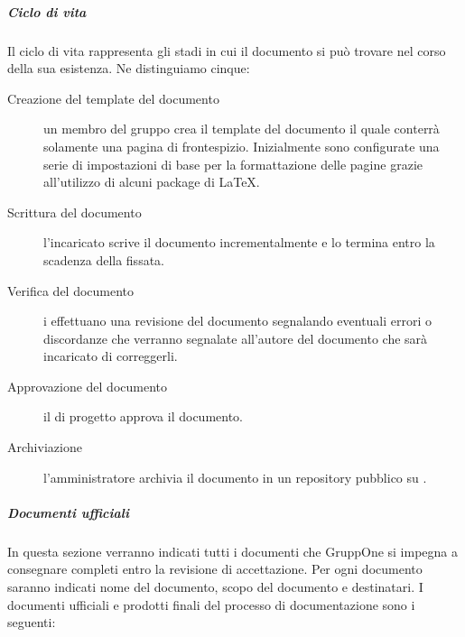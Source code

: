 \documentclass[../../norme-di-progetto.tex]{subfiles}
\begin{document}
\subparagraph{Ciclo di vita}%
\label{subp:ciclo_di_vita}
Il ciclo di vita rappresenta gli stadi in cui il documento si può trovare nel corso della sua esistenza. Ne distinguiamo cinque:

\begin{description}
  \item [Creazione del template del documento] un membro del gruppo crea il template del documento il quale conterrà solamente una pagina di frontespizio. Inizialmente sono configurate una serie di impostazioni di base per la formattazione delle pagine grazie all'utilizzo di alcuni package di \LaTeX.
  \item [Scrittura del documento] l'incaricato scrive il documento incrementalmente e lo termina entro la scadenza della  fissata.
  \item [Verifica del documento] i  effettuano una revisione del documento segnalando eventuali errori o discordanze che verranno segnalate all'autore del documento che sarà incaricato di correggerli.
  \item [Approvazione del documento] il  di progetto approva il documento.
  \item [Archiviazione] l'amministratore archivia il documento in un repository pubblico su .
\end{description}

\subparagraph{Documenti ufficiali}%
\label{subp:documenti_ufficiali}

In questa sezione verranno indicati tutti i documenti che GruppOne si impegna a consegnare completi entro la revisione di accettazione. Per ogni documento saranno indicati nome del documento, scopo del documento e destinatari.
I documenti ufficiali e prodotti finali del processo di documentazione sono i seguenti:
\end{document}
